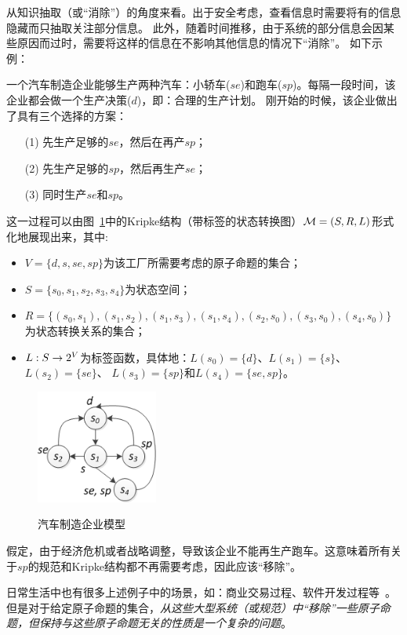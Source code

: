 从知识抽取（或“消除”）的角度来看。出于安全考虑，查看信息时需要将有的信息隐藏而只抽取关注部分信息。
此外，随着时间推移，由于系统的部分信息会因某些原因而过时，需要将这样的信息在不影响其他信息的情况下“消除”。
如下示例：
\begin{example}[汽车制造企业模型]\label{car_manufacturing}
	一个汽车制造企业能够生产两种汽车：小轿车($se$)和跑车($sp$)。每隔一段时间，该企业都会做一个生产决策($d$)，即：合理的生产计划。
	刚开始的时候，该企业做出了具有三个选择的方案：
	\begin{itemize}
		\item[(1)] 先生产足够的$se$，然后在再产$sp$；
		\item[(2)] 先生产足够的$sp$，然后再生产$se$；
		\item[(3)] 同时生产$se$和$sp$。
	\end{itemize}
	这一过程可以由图~\ref{BVM}中的Kripke结构（带标签的状态转换图）${\cal M}=(S,R,L)$形式化地展现出来，其中:
	\begin{itemize}
		\item $V=\{d,s, se, sp\}$为该工厂所需要考虑的原子命题的集合；
		\item $S=\{s_0,s_1,s_2,s_3,s_4\}$为状态空间；
		\item $R = \{(s_0, s_1), (s_1,s_2), (s_1,s_3), (s_1,s_4), (s_2,s_0), (s_3,s_0),(s_4,s_0)\}$为状态转换关系的集合；
		\item $L: S \rightarrow 2^V$为标签函数，具体地：$L(s_0) = \{d\}$、$L(s_1) = \{s\}$、 $L(s_2)=\{se\}$、 $L(s_3) = \{sp\}$和$L(s_4) = \{se,sp\}$。
	\end{itemize}
	\begin{figure}[ht]
		\centering
		\includegraphics[width=4cm]{NnewCar.png}\\
		\caption{汽车制造企业模型}\label{BVM}
	\end{figure}

假定，由于经济危机或者战略调整，导致该企业不能再生产跑车。这意味着所有关于$sp$的规范和Kripke结构都不再需要考虑，因此应该“移除”。
\end{example}

日常生活中也有很多上述例子中的场景，如：商业交易过程、软件开发过程等~\cite{Baier:PMC:2008}。
但是对于给定原子命题的集合，\emph{从这些大型系统（或规范）中“移除”一些原子命题，但保持与这些原子命题无关的性质是一个复杂的问题}。

